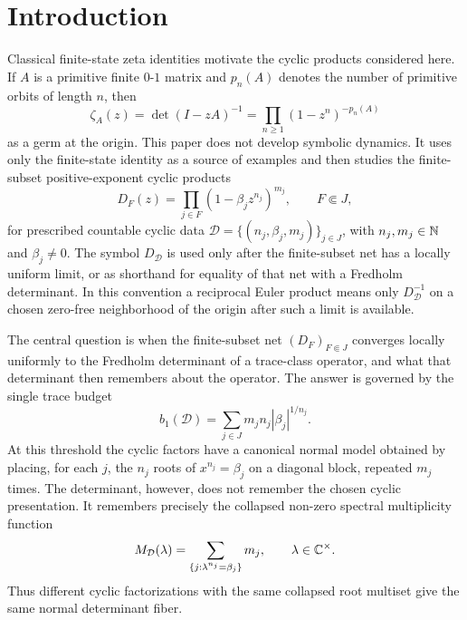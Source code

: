 \section{Introduction}\label{sec:introduction}

Classical finite-state zeta identities motivate the cyclic products considered
here.  If \(A\) is a primitive finite \(0\)-\(1\) matrix and \(p_n(A)\)
denotes the number of primitive orbits of length \(n\), then
\[
  \zeta_A(z)=\det(I-zA)^{-1}
  =\prod_{n\ge1}(1-z^n)^{-p_n(A)}
\]
as a germ at the origin.  This paper does not develop symbolic dynamics.  It
uses only the finite-state identity as a source of examples and then studies
the finite-subset positive-exponent cyclic products
\[
  D_F(z)=\prod_{j\in F}(1-\beta_j z^{n_j})^{m_j},
  \qquad F\Subset J,
\]
for prescribed countable cyclic data
\(\mathcal D=\{(n_j,\beta_j,m_j)\}_{j\in J}\), with
\(n_j,m_j\in\mathbb{N}\) and \(\beta_j\ne0\).  The symbol \(D_{\mathcal D}\) is used
only after the finite-subset net has a locally uniform limit, or as shorthand
for equality of that net with a Fredholm determinant.  In this convention a
reciprocal Euler product means only \(D_{\mathcal D}^{-1}\) on a chosen
zero-free neighborhood of the origin after such a limit is available.

The central question is when the finite-subset net \((D_F)_{F\Subset J}\)
converges locally uniformly to the Fredholm determinant of a trace-class
operator, and what that determinant then remembers about the operator.  The
answer is governed by the single trace budget
\[
  b_1(\mathcal D)=\sum_{j\in J}m_jn_j|\beta_j|^{1/n_j}.
\]
At this threshold the cyclic factors have a canonical normal model obtained by
placing, for each \(j\), the \(n_j\) roots of \(x^{n_j}=\beta_j\) on a diagonal
block, repeated \(m_j\) times.  The determinant, however, does not remember the
chosen cyclic presentation.  It remembers precisely the collapsed non-zero
spectral multiplicity function
\[
  M_{\mathcal D}(\lambda)=
  \sum_{\{j:\lambda^{n_j}=\beta_j\}}m_j,
  \qquad \lambda\in\mathbb{C}^\times .
\]
Thus different cyclic factorizations with the same collapsed root multiset give
the same normal determinant fiber.

